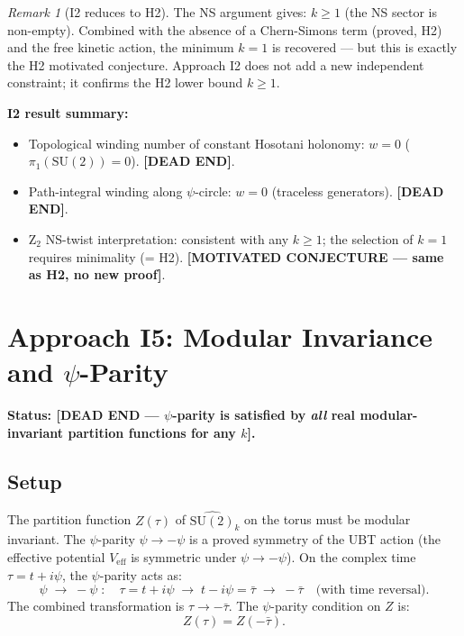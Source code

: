 \documentclass[11pt,a4paper]{article}
\theoremstyle{definition}
\theoremstyle{remark}
\newtheorem{remark}{Remark}
\begin{document}
\begin{remark}[I2 reduces to H2]
  The NS argument gives: $k \geq 1$ (the NS sector is non-empty).
  Combined with the absence of a Chern-Simons term (proved, H2) and the
  free kinetic action, the minimum $k = 1$ is recovered — but this is
  exactly the H2 motivated conjecture.  Approach I2 does not add a new
  independent constraint; it confirms the H2 lower bound $k \geq 1$.
\end{remark}

\textbf{I2 result summary:}
\begin{itemize}
  \item Topological winding number of constant Hosotani holonomy:
    $w = 0$ ($\pi_1(\mathrm{SU}(2)) = 0$).  \textbf{[DEAD END]}.
  \item Path-integral winding along $\psi$-circle: $w = 0$
    (traceless generators). \textbf{[DEAD END]}.
  \item Z$_2$ NS-twist interpretation: consistent with any $k \geq 1$;
    the selection of $k = 1$ requires minimality (= H2).
    \textbf{[MOTIVATED CONJECTURE — same as H2, no new proof]}.
\end{itemize}

\section{Approach I5: Modular Invariance and \texorpdfstring{$\psi$}{psi}-Parity}
\label{sec:I5}

\textbf{Status: [DEAD END — $\psi$-parity is satisfied by
\emph{all} real modular-invariant partition functions for any $k$].}

\subsection{Setup}

The partition function $Z(\tau)$ of $\widehat{\mathrm{SU}(2)}_k$ on the
torus must be modular invariant.  The $\psi$-parity
$\psi \to -\psi$ is a proved symmetry of the UBT action (the
effective potential $V_{\mathrm{eff}}$ is symmetric under
$\psi \to -\psi$).  On the complex time $\tau = t + i\psi$, the
$\psi$-parity acts as:
\begin{equation}
  \psi \;\to\; -\psi \;:\quad \tau = t + i\psi \;\to\; t - i\psi = \bar\tau
  \;\to\; -\bar\tau
  \quad\text{(with time reversal).}
  \label{eq:psi_parity_action}
\end{equation}
The combined transformation is $\tau \to -\bar\tau$.  The
$\psi$-parity condition on $Z$ is:
\begin{equation}
  Z(\tau) = Z(-\bar\tau).
  \label{eq:psi_parity_Z}
\end{equation}
\end{document}
